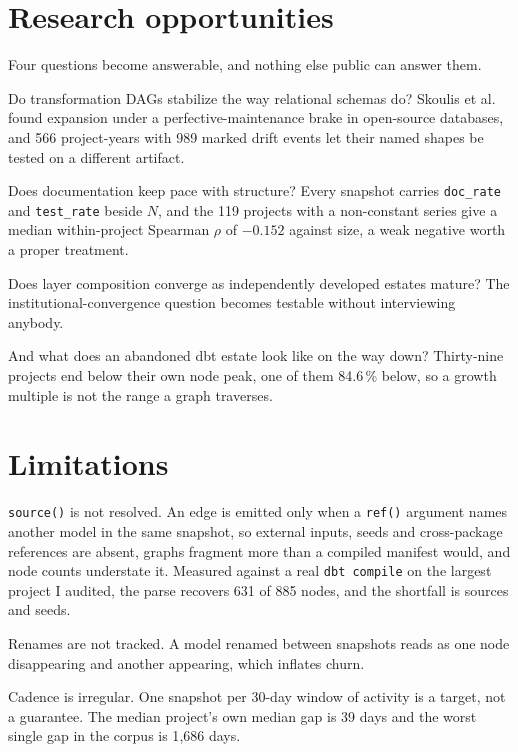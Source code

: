 \documentclass[10pt,conference]{IEEEtran}
\begin{document}
\section{Research opportunities}

Four questions become answerable, and nothing else public can answer them.

Do transformation DAGs stabilize the way relational schemas do? Skoulis et
al.~\cite{skoulis2015} found expansion under a perfective-maintenance brake in
open-source databases, and 566 project-years with 989 marked drift events let
their named shapes be tested on a different artifact.

Does documentation keep pace with structure? Every snapshot carries
\texttt{doc\_rate} and \texttt{test\_rate} beside $N$, and the 119 projects with
a non-constant series give a median within-project Spearman $\rho$ of $-0.152$
against size, a weak negative worth a proper treatment.

Does layer composition converge as independently developed estates mature? The
institutional-convergence question becomes testable without interviewing
anybody.

And what does an abandoned dbt estate look like on the way down? Thirty-nine
projects end below their own node peak, one of them 84.6\,\% below, so a growth
multiple is not the range a graph traverses.

\section{Limitations}
\label{sec:limits}

\texttt{source()} is not resolved. An edge is emitted only when a \texttt{ref()}
argument names another model in the same snapshot, so external inputs, seeds and
cross-package references are absent, graphs fragment more than a compiled
manifest would, and node counts understate it. Measured against a real
\texttt{dbt compile} on the largest project I audited, the parse recovers 631 of
885 nodes, and the shortfall is sources and seeds.

Renames are not tracked. A model renamed between snapshots reads as one node
disappearing and another appearing, which inflates churn.

Cadence is irregular. One snapshot per 30-day window of activity is a target,
not a guarantee. The median project's own median gap is 39 days and the worst
single gap in the corpus is 1{,}686 days.
\end{document}
